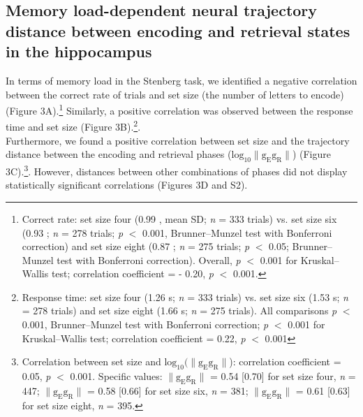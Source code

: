 \documentclass[final,3p,times,twocolumn]{elsarticle}
\begin{document}
\subsection{Memory load-dependent neural trajectory distance between encoding and retrieval states in the hippocampus}
In terms of memory load in the Stenberg task, we identified a negative correlation between the correct rate of trials and set size (the number of letters to encode) (Figure 3A).\footnote{Correct rate: set size four (0.99 , mean \textpm SD; \textit{n} = 333 trials) vs. set size six (0.93 ; \textit{n} = 278 trials; \textit{p} $<$ 0.001, Brunner--Munzel test with Bonferroni correction) and set size eight (0.87 ; \textit{n} = 275 trials; \textit{p} $<$ 0.05; Brunner--Munzel test with Bonferroni correction). Overall, \textit{p} $<$ 0.001 for Kruskal--Wallis test; correlation coefficient = - 0.20, \textit{p} $<$ 0.001.} Similarly, a positive correlation was observed between the response time and set size (Figure 3B).\footnote{Response time: set size four (1.26  s; \textit{n} = 333 trials) vs. set size six (1.53  s; \textit{n} = 278 trials) and set size eight (1.66  s; \textit{n} = 275 trials). All comparisons \textit{p} $<$ 0.001, Brunner--Munzel test with Bonferroni correction; \textit{p} $<$ 0.001 for Kruskal--Wallis test; correlation coefficient = 0.22, \textit{p} $<$ 0.001}.
\\
\indent
Furthermore, we found a positive correlation between set size and the trajectory distance between the encoding and retrieval phases ($\mathrm{log_{10}\lVert g_{E}g_{R} \rVert}$) (Figure 3C).\footnote{Correlation between set size and $\mathrm{log_{10}(\lVert g_{E}g_{R} \rVert}$): correlation coefficient = 0.05, \textit{p} $<$ 0.001. Specific values: $\mathrm{\lVert g_{E}g_{R} \rVert}$ = 0.54 [0.70] for set size four, \textit{n} = 447; $\mathrm{\lVert g_{E}g_{R} \rVert}$ = 0.58 [0.66] for set size six, \textit{n} = 381; $\mathrm{\lVert g_{E}g_{R} \rVert}$ = 0.61 [0.63] for set size eight, \textit{n} = 395.}. However, distances between other combinations of phases did not display statistically significant correlations (Figures 3D and S2).
\end{document}
